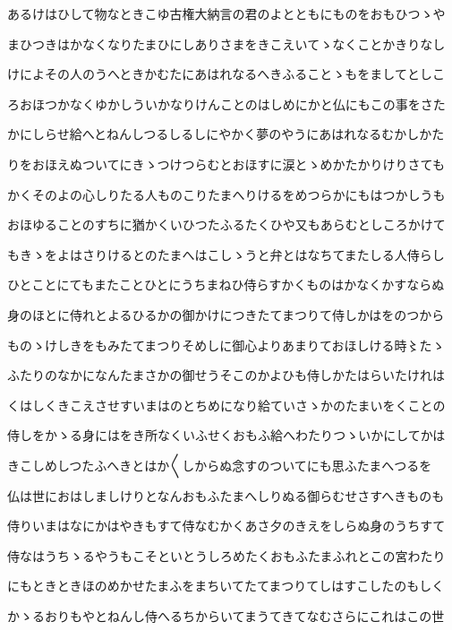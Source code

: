 \documentclass[a4paper,11pt,landscape]{ltjtarticle}
\begin{document}
\par\medskip
あるけはひして物なときこゆ古権大納言の君のよとともにものをおもひつゝや
\par\medskip
まひつきはかなくなりたまひにしありさまをきこえいてゝなくことかきりなし
\par\medskip
けによその人のうへときかむたにあはれなるへきふることゝもをましてとしこ
\par\medskip
ろおほつかなくゆかしういかなりけんことのはしめにかと仏にもこの事をさた
\par\medskip
かにしらせ給へとねんしつるしるしにやかく夢のやうにあはれなるむかしかた
\par\medskip
りをおほえぬついてにきゝつけつらむとおほすに涙とゝめかたかりけりさても
\par\medskip
かくそのよの心しりたる人ものこりたまへりけるをめつらかにもはつかしうも
\par\medskip
おほゆることのすちに猶かくいひつたふるたくひや又もあらむとしころかけて
\par\medskip
もきゝをよはさりけるとのたまへはこしゝうと弁とはなちてまたしる人侍らし
\par\medskip
ひとことにてもまたことひとにうちまねひ侍らすかくものはかなくかすならぬ
\par\medskip
身のほとに侍れとよるひるかの御かけにつきたてまつりて侍しかはをのつから
\par\medskip
ものゝけしきをもみたてまつりそめしに御心よりあまりておほしける時〻たゝ
\par\medskip
ふたりのなかになんたまさかの御せうそこのかよひも侍しかたはらいたけれは
\par\medskip
くはしくきこえさせすいまはのとちめになり給ていさゝかのたまいをくことの
\par\medskip
侍しをかゝる身にはをき所なくいふせくおもふ給へわたりつゝいかにしてかは
\par\medskip
きこしめしつたふへきとはか〱しからぬ念すのついてにも思ふたまへつるを
\par\medskip
仏は世におはしましけりとなんおもふたまへしりぬる御らむせさすへきものも
\par\medskip
侍りいまはなにかはやきもすて侍なむかくあさ夕のきえをしらぬ身のうちすて
\par\medskip
侍なはうちゝるやうもこそといとうしろめたくおもふたまふれとこの宮わたり
\par\medskip
にもときときほのめかせたまふをまちいてたてまつりてしはすこしたのもしく
\par\medskip
かゝるおりもやとねんし侍へるちからいてまうてきてなむさらにこれはこの世
\end{document}
